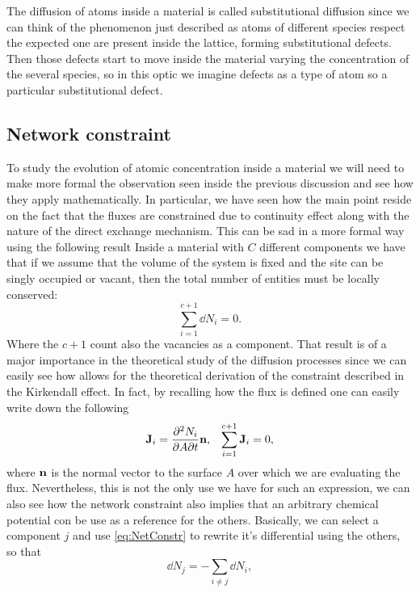 \nt
{
    The diffusion of atoms inside a material is called substitutional diffusion since we can think of the phenomenon just described as atoms of different species respect the expected one are present inside the lattice, forming substitutional defects. Then those defects start to move inside the material varying the concentration of the several species, so in this optic we imagine defects as a type of atom so a particular substitutional defect. 
}

\subsection{Network constraint}

To study the evolution of atomic concentration inside a material we will need to make more formal the observation seen inside the previous discussion and see how they apply mathematically. In particular, we have seen how the main point reside on the fact that the fluxes are constrained due to continuity effect along with the nature of the direct exchange mechanism. This can be sad in a more formal way using the following result
{
    Inside a material with $C$ different components we have that if we assume that the volume of the system is fixed and the site can be singly occupied or vacant, then the total number of entities must be locally conserved:
    \begin{equation}
        \label{eq:NetConstr}
        \sum_{i=1} ^{c+1} \dd N_i = 0.
    \end{equation}
    Where the $c+1$ count also the vacancies as a component.
}
\noindent
That result is of a major importance in the theoretical study of the diffusion processes since we can easily see how allows for the theoretical derivation of the constraint described in the Kirkendall effect. In fact, by recalling how the flux is defined one can easily write down the following
\begin{align}
    \label{eq:FluxResult}
    &\vb{J}_i = \pdv{N_i}{A}{t}\vb{n}, &\sum_{i=1}^{c+1}\vb{J}_i = 0,
\end{align}
where $\vb{n}$ is the normal vector to the surface $A$ over which we are evaluating the flux. Nevertheless, this is not the only use we have for such an expression, we can also see how the network constraint also implies that an arbitrary chemical potential con be use as a reference for the others. Basically, we can select a component $j$ and use \eqref{eq:NetConstr} to rewrite it's differential using the others, so that
\begin{equation}
    \dd N_j = -\sum_{i\neq j} \dd N_i,
\end{equation}
